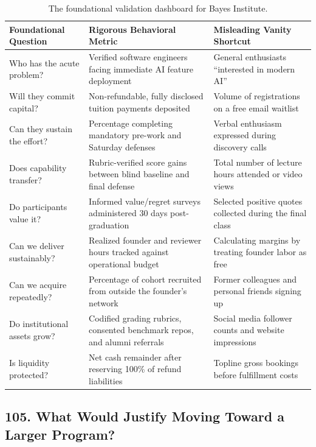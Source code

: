 \begin{table}[t]
\centering
\small
\begin{tabularx}{\textwidth}{>{\raggedright\arraybackslash}p{4cm} >{\raggedright\arraybackslash}X >{\raggedright\arraybackslash}p{4.5cm}}
\toprule
\textbf{Foundational Question} & \textbf{Rigorous Behavioral Metric} & \textbf{Misleading Vanity Shortcut} \\
\midrule
Who has the acute problem? & Verified software engineers facing immediate AI feature deployment & General enthusiasts ``interested in modern AI'' \\
Will they commit capital? & Non-refundable, fully disclosed tuition payments deposited & Volume of registrations on a free email waitlist \\
Can they sustain the effort? & Percentage completing mandatory pre-work and Saturday defenses & Verbal enthusiasm expressed during discovery calls \\
Does capability transfer? & Rubric-verified score gains between blind baseline and final defense & Total number of lecture hours attended or video views \\
Do participants value it? & Informed value/regret surveys administered 30 days post-graduation & Selected positive quotes collected during the final class \\
Can we deliver sustainably? & Realized founder and reviewer hours tracked against operational budget & Calculating margins by treating founder labor as free \\
Can we acquire repeatedly? & Percentage of cohort recruited from outside the founder's network & Former colleagues and personal friends signing up \\
Do institutional assets grow? & Codified grading rubrics, consented benchmark repos, and alumni referrals & Social media follower counts and website impressions \\
Is liquidity protected? & Net cash remainder after reserving 100\% of refund liabilities & Topline gross bookings before fulfillment costs \\
\bottomrule
\end{tabularx}
\caption{The foundational validation dashboard for Bayes Institute.}
\label{tab:ch9-bayes-dashboard}
\end{table}

\subsection*{105. What Would Justify Moving Toward a Larger Program?}

